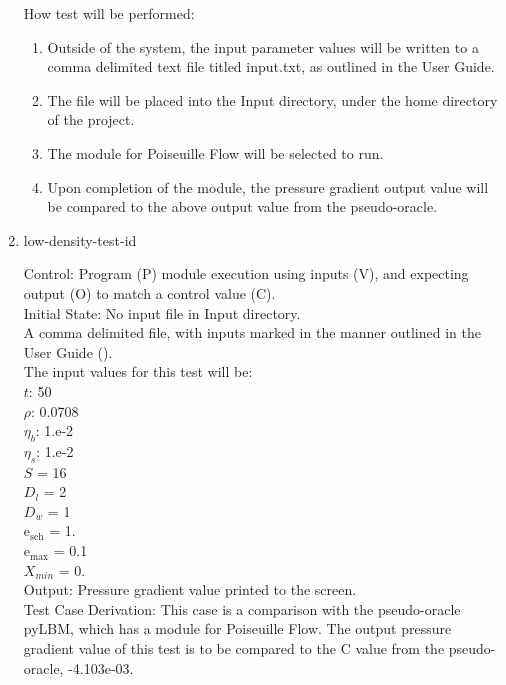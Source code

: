 \documentclass[12pt, titlepage]{article}
\newcounter{testcounter} %
\begin{document}
\begin{enumerate}
How test will be performed: 

\begin{enumerate}
\item Outside of the system, the input parameter values will be written to a
comma delimited text file titled input.txt, as outlined in the User Guide.
\item The file will be placed into the Input directory, under the home directory
of the project.
\item The module for Poiseuille Flow will be selected to run.
\item Upon completion of the module, the pressure gradient output value will be
compared to the above output value from the pseudo-oracle.
\end{enumerate}			

\item{low-density-test-id\thetestcounter \\}

Control: Program (P) module execution using inputs (V), and expecting output (O) to match a control value (C).\\
					
Initial State: No input file in Input directory.\\
					
A comma delimited file, with inputs marked in the manner outlined in the User
Guide (\citet{LBM_UserGuide_PM}).\\The input values for this test will be:\\

$t$: 50\\
$\rho$: 0.0708\\
$\eta_b$: 1.e-2\\
$\eta_s$: 1.e-2\\
$S$ = 16\\
$D_{l}$ = 2\\
$D_{w}$ = 1\\
$\mathrm{e_{sch}}$ = 1.\\
$\mathrm{e_{max}}$ = 0.1\\
$X_{min}$ = 0.\\

					
Output: Pressure gradient value printed to the screen. \\ 

Test Case Derivation: This case is a comparison with the pseudo-oracle pyLBM,
which has a module for Poiseuille Flow. The output pressure gradient value of
this test is to be compared to the C value from the pseudo-oracle,
-4.103e-03.\\
					

\end{enumerate}
\end{document}
